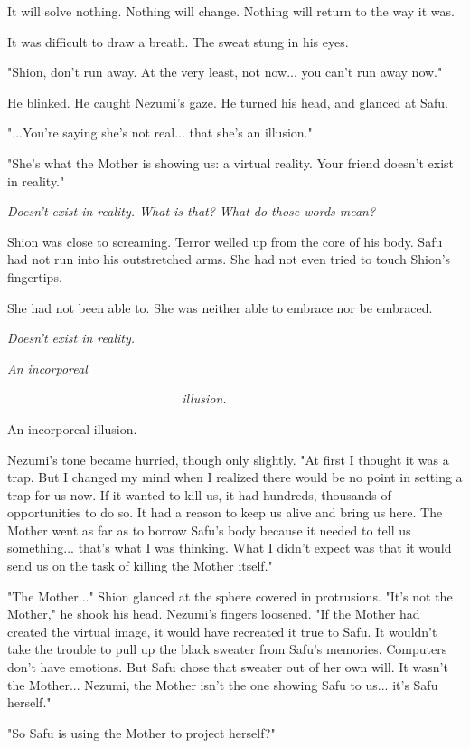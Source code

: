 It will solve nothing. Nothing will change. Nothing will return to the
way it was.

It was difficult to draw a breath. The sweat stung in his eyes.

"Shion, don't run away. At the very least, not now... you can't run away
now."

He blinked. He caught Nezumi's gaze. He turned his head, and glanced at
Safu.

"...You're saying she's not real... that she's an illusion."

"She's what the Mother is showing us: a virtual reality. Your friend
doesn't exist in reality."

\emph{Doesn't exist in reality. What is that? What do those words mean?}

Shion was close to screaming. Terror welled up from the core of his
body. Safu had not run into his outstretched arms. She had not even
tried to touch Shion's fingertips.

She had not been able to. She was neither able to embrace nor be
embraced.

\emph{Doesn't exist in reality.}

\emph{An incorporeal}

\emph{~~~~~~~~~~~~~~~~~~~~~~~~~~~illusion.}

An incorporeal illusion.

Nezumi's tone became hurried, though only slightly. "At first I thought
it was a trap. But I changed my mind when I realized there would be no
point in setting a trap for us now. If it wanted to kill us, it had
hundreds, thousands of opportunities to do so. It had a reason to keep
us alive and bring us here. The Mother went as far as to borrow Safu's
body because it needed to tell us something... that's what I was
thinking. What I didn't expect was that it would send us on the task of
killing the Mother itself."

"The Mother..." Shion glanced at the sphere covered in protrusions.
"It's not the Mother," he shook his head. Nezumi's fingers loosened. "If
the Mother had created the virtual image, it would have recreated it
true to Safu. It wouldn't take the trouble to pull up the black sweater
from Safu's memories. Computers don't have emotions. But Safu chose that
sweater out of her own will. It wasn't the Mother... Nezumi, the Mother
isn't the one showing Safu to us... it's Safu herself."

"So Safu is using the Mother to project herself?"

